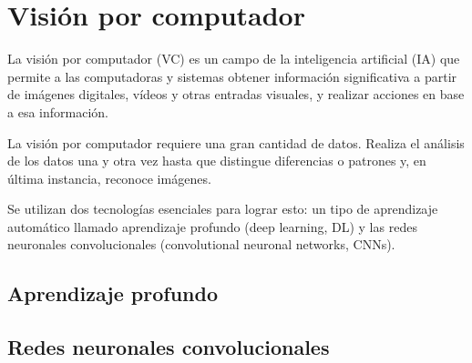 \section{Visión por computador}
La visión por computador (VC) \cite{15} es un campo de la inteligencia artificial (IA) que permite a las computadoras y sistemas obtener información significativa a partir de imágenes digitales, vídeos y otras entradas visuales, y realizar acciones en base a esa información.

La visión por computador requiere una gran cantidad de datos. Realiza el análisis de los datos una y otra vez hasta que distingue diferencias o patrones y, en última instancia, reconoce imágenes. 

Se utilizan dos tecnologías esenciales para lograr esto: un tipo de aprendizaje automático llamado aprendizaje profundo (deep learning, DL) y las redes neuronales convolucionales (convolutional neuronal networks, CNNs).


\subsection{Aprendizaje profundo}


\subsection{Redes neuronales convolucionales}